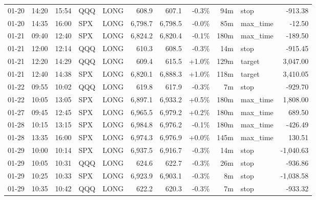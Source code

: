 \documentclass[11pt,a4paper,twoside]{article}
\begin{document}
\begin{center}
\begin{longtable}{>{\color{txtmain}}l l l l l r r r r >{\color{txtmain}}l r}
01-20 & 14:20 & 15:54 & QQQ & LONG & 608.9 & 607.1 & \textcolor{lossred}{-0.3\%} & 94m & stop & \textcolor{lossred}{-913.38} \\
01-20 & 14:35 & 16:00 & SPX & LONG & 6,798.7 & 6,798.5 & \textcolor{lossred}{-0.0\%} & 85m & max\_time & \textcolor{lossred}{-12.50} \\
01-21 & 09:40 & 12:40 & SPX & LONG & 6,824.2 & 6,820.4 & \textcolor{lossred}{-0.1\%} & 180m & max\_time & \textcolor{lossred}{-189.50} \\
01-21 & 12:00 & 12:14 & QQQ & LONG & 610.3 & 608.5 & \textcolor{lossred}{-0.3\%} & 14m & stop & \textcolor{lossred}{-915.45} \\
01-21 & 12:20 & 14:29 & QQQ & LONG & 609.4 & 615.5 & \textcolor{wingreen}{+1.0\%} & 129m & target & \textcolor{wingreen}{3,047.00} \\
01-21 & 12:40 & 14:38 & SPX & LONG & 6,820.1 & 6,888.3 & \textcolor{wingreen}{+1.0\%} & 118m & target & \textcolor{wingreen}{3,410.05} \\
01-22 & 09:55 & 10:02 & QQQ & LONG & 619.8 & 617.9 & \textcolor{lossred}{-0.3\%} & 7m & stop & \textcolor{lossred}{-929.70} \\
01-22 & 10:05 & 13:05 & SPX & LONG & 6,897.1 & 6,933.2 & \textcolor{wingreen}{+0.5\%} & 180m & max\_time & \textcolor{wingreen}{1,808.00} \\
01-27 & 09:45 & 12:45 & SPX & LONG & 6,965.5 & 6,979.2 & \textcolor{wingreen}{+0.2\%} & 180m & max\_time & \textcolor{wingreen}{689.50} \\
01-28 & 10:15 & 13:15 & SPX & LONG & 6,984.8 & 6,976.2 & \textcolor{lossred}{-0.1\%} & 180m & max\_time & \textcolor{lossred}{-426.49} \\
01-28 & 13:35 & 16:00 & SPX & LONG & 6,974.3 & 6,976.9 & \textcolor{wingreen}{+0.0\%} & 145m & max\_time & \textcolor{wingreen}{130.51} \\
01-29 & 10:00 & 10:14 & SPX & LONG & 6,937.5 & 6,916.7 & \textcolor{lossred}{-0.3\%} & 14m & stop & \textcolor{lossred}{-1,040.63} \\
01-29 & 10:05 & 10:31 & QQQ & LONG & 624.6 & 622.7 & \textcolor{lossred}{-0.3\%} & 26m & stop & \textcolor{lossred}{-936.86} \\
01-29 & 10:25 & 10:33 & SPX & LONG & 6,923.9 & 6,903.1 & \textcolor{lossred}{-0.3\%} & 8m & stop & \textcolor{lossred}{-1,038.58} \\
01-29 & 10:35 & 10:42 & QQQ & LONG & 622.2 & 620.3 & \textcolor{lossred}{-0.3\%} & 7m & stop & \textcolor{lossred}{-933.32} \\

\end{longtable}
\end{center}
\end{document}

